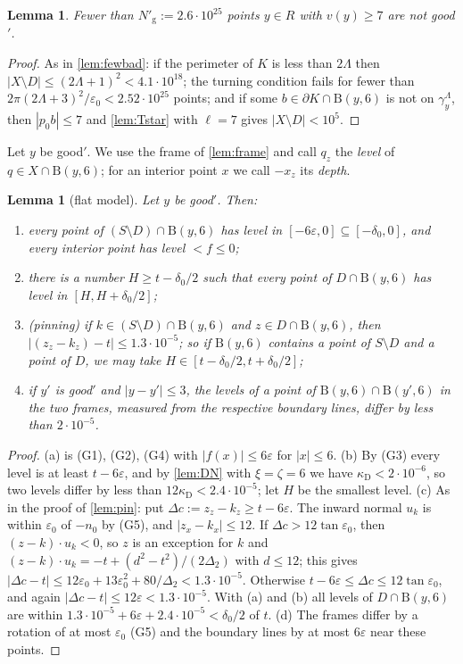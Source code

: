 \documentclass[11pt]{amsart}
\newtheorem{lemma}[theorem]{Lemma}
\theoremstyle{definition}
\theoremstyle{remark}
\newcommand{\Dt}{\Delta_2}
\newcommand{\eps}{\varepsilon}
\newcommand{\Dd}{\mathrm{B}}      %
\begin{document}
\begin{lemma}\label{lem:fewbad2}
Fewer than $N'_{\mathrm g}:=2.6\cdot10^{25}$ points $y\in R$ with $v(y)\ge7$ are not good$'$.
\end{lemma}
\begin{proof}
As in \cref{lem:fewbad}: if the perimeter of $K$ is less than $2\Lambda$ then $|X\setminus D|\le(2\Lambda+1)^2<4.1\cdot10^{18}$; the turning condition fails for fewer than $2\pi(2\Lambda+3)^2/\eps_0<2.52\cdot10^{25}$ points; and if some $b\in\partial K\cap\Dd(y,6)$ is not on $\gamma^\Lambda_y$, then $|p_0b|\le7$ and \cref{lem:Tstar} with $\ell=7$ gives $|X\setminus D|<10^5$.
\end{proof}

Let $y$ be good$'$. We use the frame of \cref{lem:frame} and call $q_z$ the \emph{level} of $q\in X\cap\Dd(y,6)$; for an interior point $x$ we call $-x_z$ its \emph{depth}.

\begin{lemma}[flat model]\label{lem:flatmodel}
Let $y$ be good$'$. Then:
\begin{enumerate}[label=\textup{(\alph*)}]
\item every point of $(S\setminus D)\cap\Dd(y,6)$ has level in $[-6\eps,0]\subseteq[-\delta_0,0]$, and every interior point has level $<f\le0$;
\item there is a number $H\ge t-\delta_0/2$ such that every point of $D\cap\Dd(y,6)$ has level in $[H,H+\delta_0/2]$;
\item \emph{(pinning)} if $k\in(S\setminus D)\cap\Dd(y,6)$ and $z\in D\cap\Dd(y,6)$, then $|(z_z-k_z)-t|\le1.3\cdot10^{-5}$; so if $\Dd(y,6)$ contains a point of $S\setminus D$ and a point of $D$, we may take $H\in[t-\delta_0/2,t+\delta_0/2]$;
\item if $y'$ is good$'$ and $|y-y'|\le3$, the levels of a point of $\Dd(y,6)\cap\Dd(y',6)$ in the two frames, measured from the respective boundary lines, differ by less than $2\cdot10^{-5}$.
\end{enumerate}
\end{lemma}
\begin{proof}
(a) is (G1), (G2), (G4) with $|f(x)|\le6\eps$ for $|x|\le6$. (b) By (G3) every level is at least $t-6\eps$, and by \cref{lem:DN} with $\xi=\zeta=6$ we have $\kappa_{\mathrm D}<2\cdot10^{-6}$, so two levels differ by less than $12\kappa_{\mathrm D}<2.4\cdot10^{-5}$; let $H$ be the smallest level. (c) As in the proof of \cref{lem:pin}: put $\Delta c:=z_z-k_z\ge t-6\eps$. The inward normal $u_k$ is within $\eps_0$ of $-n_0$ by (G5), and $|z_x-k_x|\le12$. If $\Delta c>12\tan\eps_0$, then $(z-k)\cdot u_k<0$, so $z$ is an exception for $k$ and $(z-k)\cdot u_k=-t+(d^2-t^2)/(2\Dt)$ with $d\le12$; this gives $|\Delta c-t|\le12\eps_0+13\eps_0^2+80/\Dt<1.3\cdot10^{-5}$. Otherwise $t-6\eps\le\Delta c\le12\tan\eps_0$, and again $|\Delta c-t|\le12\eps<1.3\cdot10^{-5}$. With (a) and (b) all levels of $D\cap\Dd(y,6)$ are within $1.3\cdot10^{-5}+6\eps+2.4\cdot10^{-5}<\delta_0/2$ of $t$. (d) The frames differ by a rotation of at most $\eps_0$ (G5) and the boundary lines by at most $6\eps$ near these points.
\end{proof}
\end{document}
